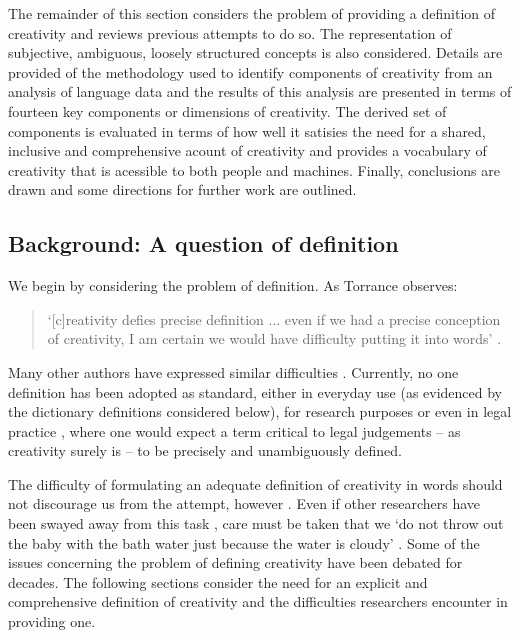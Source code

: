 \documentclass[10pt,letterpaper]{article}
\begin{document}
The remainder of this section considers the problem of providing a definition of creativity and reviews previous attempts to do so. The representation of subjective, ambiguous, loosely structured concepts is also considered.
Details are provided of the methodology used to identify components of creativity from an analysis of language data and the results of this analysis are presented in terms of fourteen key components or dimensions of creativity. The derived set of components is evaluated in terms of how well it satisies the need for a shared, inclusive and comprehensive acount of creativity and provides a vocabulary of creativity that is acessible to both people and machines. Finally, conclusions are drawn and some directions for further work are outlined.

\subsection*{Background: A question of definition} \label{background}

We begin by considering the problem of definition. As Torrance observes:

\begin{quote}
`[c]reativity defies precise definition ... even if we had a precise conception of creativity, I am certain we would have difficulty putting it into words' \cite[p. 43]{torrance88}. 
\end{quote}

Many other authors have expressed similar difficulties \cite{rhodes61,sternberg99a,kaufman09}. Currently, no one definition has been adopted as standard, either in everyday use (as evidenced by the dictionary definitions considered below), for research purposes \cite{rhodes61,taylor88,plucker04defn} or even in legal practice \cite{clifford04,mandel11}, where one would expect a term critical to legal judgements  -- as creativity surely is \cite{feist91,karjala08,schafer15} -- to be precisely and unambiguously defined. 

The difficulty of formulating an adequate definition of creativity in words should not discourage us from the attempt, however  \cite{rhodes61,plucker04defn,kaufman09}. Even if other researchers have been swayed away from this task \cite[for example]{sternberg99a,veale06preface},  care must be taken that we `do not throw out the baby with the bath water just because the water is cloudy' \cite[p. 310]{rhodes61}. Some of the issues concerning the problem of defining creativity have been debated for decades. The following sections consider the need for an explicit and comprehensive definition of creativity and the difficulties researchers encounter in providing one. 
\end{document}
